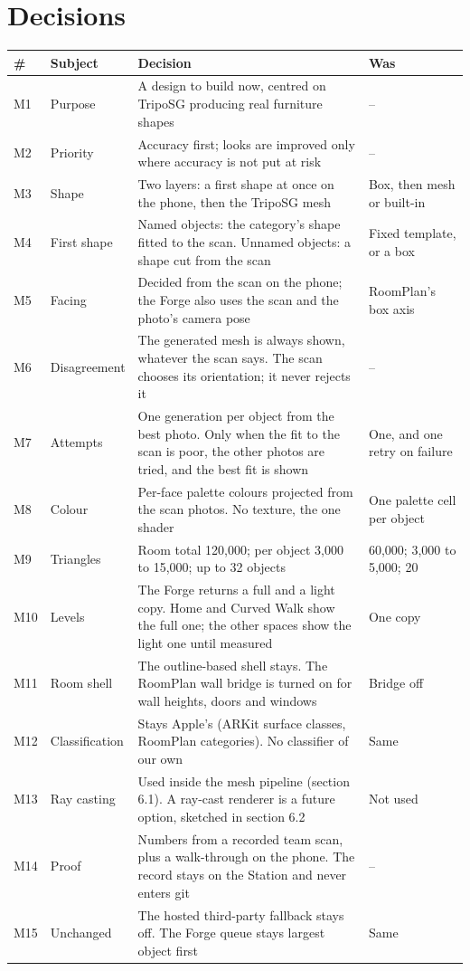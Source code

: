 \documentclass[10pt]{article}
\newcommand{\hd}[1]{\textbf{#1}}
\begin{document}
\needspace{50mm}
\section{Decisions}

{\small
\begin{longtable}{@{}L{9mm}L{23mm}L{95mm}L{42mm}@{}}
\toprule
\hd{\#} & \hd{Subject} & \hd{Decision} & \hd{Was}\\
\midrule
\endhead
M1 & Purpose & A design to build now, centred on TripoSG producing real furniture shapes & --\\
M2 & Priority & Accuracy first; looks are improved only where accuracy is not put at risk & --\\
M3 & Shape & Two layers: a first shape at once on the phone, then the TripoSG mesh & Box, then mesh or built-in\\
M4 & First shape & Named objects: the category's shape fitted to the scan. Unnamed objects: a shape cut from the scan &
Fixed template, or a box\\
M5 & Facing & Decided from the scan on the phone; the Forge also uses the scan and the photo's camera pose & RoomPlan's box
axis\\
M6 & Disagreement & The generated mesh is always shown, whatever the scan says. The scan chooses its orientation; it never
rejects it & --\\
M7 & Attempts & One generation per object from the best photo. Only when the fit to the scan is poor, the other photos are
tried, and the best fit is shown & One, and one retry on failure\\
M8 & Colour & Per-face palette colours projected from the scan photos. No texture, the one shader & One palette cell per
object\\
M9 & Triangles & Room total 120,000; per object 3,000 to 15,000; up to 32 objects & 60,000; 3,000 to 5,000; 20\\
M10 & Levels & The Forge returns a full and a light copy. Home and Curved Walk show the full one; the other spaces show the
light one until measured & One copy\\
M11 & Room shell & The outline-based shell stays. The RoomPlan wall bridge is turned on for wall heights, doors and windows &
Bridge off\\
M12 & Classification & Stays Apple's (ARKit surface classes, RoomPlan categories). No classifier of our own & Same\\
M13 & Ray casting & Used inside the mesh pipeline (section 6.1). A ray-cast renderer is a future option, sketched in section
6.2 & Not used\\
M14 & Proof & Numbers from a recorded team scan, plus a walk-through on the phone. The record stays on the Station and never
enters git & --\\
M15 & Unchanged & The hosted third-party fallback stays off. The Forge queue stays largest object first & Same\\
\bottomrule
\end{longtable}}
\end{document}
